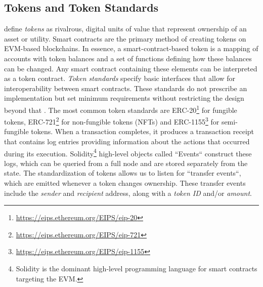 \documentclass[12pt,a4paper,titlepage,oneside,english]{article}
\begin{document}
\subsection{Tokens and Token Standards}
\cite{roth2019tokenization} define \textit{tokens} as rivalrous, digital units of value that represent ownership of an asset or utility. Smart contracts are the primary method of creating tokens on EVM-based blockchains. In essence, a smart-contract-based token is a mapping of accounts with token balances and a set of functions defining how these balances can be changed. Any smart contract containing these elements can be interpreted as a token contract. \citep{roth2019tokenization} \newline
\textit{Token standards} specify basic interfaces that allow for interoperability between smart contracts. These standards do not prescribe an implementation but set minimum requirements without restricting the design beyond that \citep{mastering_ethereum}. 
The most common token standards are ERC-20\footnote{\url{https://eips.ethereum.org/EIPS/eip-20}} for fungible tokens, ERC-721\footnote{\url{https://eips.ethereum.org/EIPS/eip-721}} for non-fungible tokens (NFTs) and ERC-1155\footnote{\url{https://eips.ethereum.org/EIPS/eip-1155}} for semi-fungible tokens.\newline
When a transaction completes, it produces a transaction receipt that contains log entries providing information about the actions that occurred during its execution. Solidity\footnote{Solidity is the dominant high-level programming language for smart contracts targeting the EVM.} high-level objects called ``Events`` construct these logs, which can be queried from a full node and are stored separately from the state. \citep{mastering_ethereum} \newline
The standardization of tokens allows us to listen for ``transfer events``, which are emitted whenever a token changes ownership.
These transfer events include the \textit{sender} and \textit{recipient} address, along with a \textit{token ID} and/or \textit{amount}. 
\end{document}
